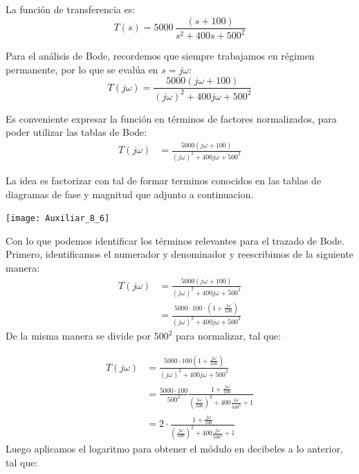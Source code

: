 \documentclass[
  11pt,
  letterpaper,
   addpoints,
   answers
  ]{exam}
\begin{document}
\begin{questions}
\begin{solution}
   La función de transferencia es:
\begin{equation}
    T(s) = 5000\,\frac{(s+100)}{s^2 + 400s + 500^2}
\end{equation}

Para el análisis de Bode, recordemos que siempre trabajamos en régimen permanente, por lo que se evalúa en \( s = j\omega \):
\[
T(j\omega) = \frac{5000(j\omega + 100)}{(j\omega)^2 + 400j\omega + 500^2}
\]

Es conveniente expresar la función en términos de factores normalizados, para poder utilizar las tablas de Bode:
\begin{align*}
T(j\omega) &= \frac{5000(j\omega + 100)}{(j\omega)^2 + 400j\omega + 500^{2}} 
\end{align*}

La idea es factorizar con tal de formar terminos conocidos en las tablas de diagramas de fase y magnitud que adjunto a continuacion.

\begin{center}
\texttt{[image: Auxiliar\_8\_6]}
\end{center}
Con lo que podemos identificar los términos relevantes para el trazado de Bode. Primero, identificamos el numerador y denominador y reescribimos de la siguiente manera:
\begin{align*}
T(j\omega) &= \frac{5000(j\omega + 100)}{(j\omega)^2 + 400j\omega + 500^{2}} \\
&=  \frac{5000 \cdot 100 \cdot \left(1+ \frac{j\omega}{100}\right)}{(j\omega)^2 + 400j\omega + 500^{2}}
\end{align*}
De la misma manera se divide por \(500^2\) para normalizar, tal que:

\begin{align}
    T(j\omega) &= \frac{5000 \cdot 100 \left(1+ \frac{j\omega}{100}\right)}{(j\omega)^2 + 400j\omega + 500^{2}} \\
    &= \frac{5000 \cdot 100}{500^{2}} \frac{1 + \frac{j\omega}{100}}{\left( \frac{j\omega}{500} \right)^2 + 400 \frac{j\omega}{500^{2}} + 1}\\
    &= 2 \cdot \frac{1 + \frac{j\omega}{100}}{\left( \frac{j\omega}{500} \right)^2 + 400 \frac{j\omega}{500^{2}} + 1 }
\end{align}
Luego aplicamos el logaritmo para obtener el módulo en decibeles a lo anterior, tal que:


\end{solution}
\end{questions}
\end{document}
